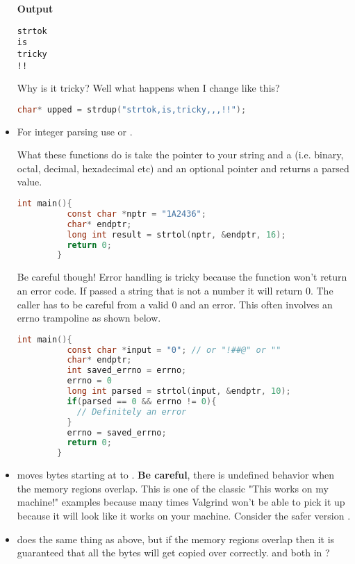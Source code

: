 \begin{itemize}
	      \textbf{Output}

	      \begin{lstlisting}[language=console]
strtok
is
tricky
!!
\end{lstlisting}

	      Why is it tricky? Well what happens when I change  like this?

	      \begin{lstlisting}[language=C]
        char* upped = strdup("strtok,is,tricky,,,!!");
\end{lstlisting}

	\item For integer parsing use
	      or
	      .

	      What these functions do is take the pointer to your string
	       and a  (i.e. binary, octal, decimal,
	      hexadecimal etc) and an optional pointer  and returns a
	      parsed value.

	      \begin{lstlisting}[language=C]
        int main(){
          const char *nptr = "1A2436";
          char* endptr;
          long int result = strtol(nptr, &endptr, 16);
          return 0;
        }
\end{lstlisting}

	      Be careful though!
        Error handling is tricky because the function won't return an error code.
        If passed a string that is not a number it will return 0.
        The caller has to be careful from a valid 0 and an error.
        This often involves an errno trampoline as shown below.

	      \begin{lstlisting}[language=C]
        int main(){
          const char *input = "0"; // or "!##@" or ""
          char* endptr;
          int saved_errno = errno;
          errno = 0
          long int parsed = strtol(input, &endptr, 10);
          if(parsed == 0 && errno != 0){
            // Definitely an error
          }
          errno = saved_errno;
          return 0;
        }
\end{lstlisting}

	    \item {} moves  bytes starting at  to .
        \textbf{Be careful}, there is undefined behavior when the memory regions overlap.
        This is one of the classic "This works on my machine!" examples because many times Valgrind won't be able to pick it up because it will look like it works on your machine.
        Consider the safer version .

	    \item {} does the same thing as above, but if the memory regions overlap then it is guaranteed that all the bytes will get copied over correctly.
         and  both in ?
\end{itemize}


